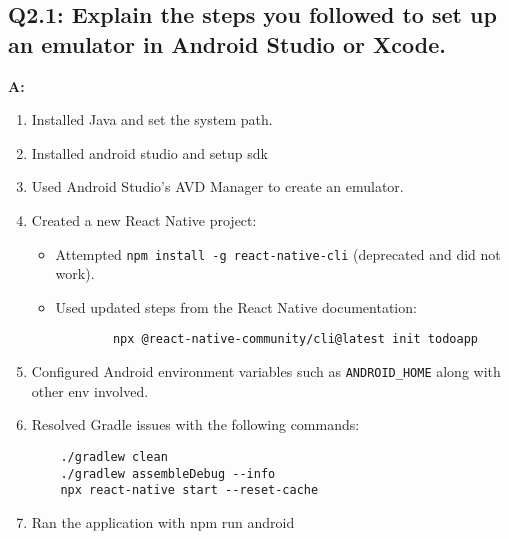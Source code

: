 \documentclass{article}
\begin{document}
\subsection*{Q2.1: Explain the steps you followed to set up an emulator in Android Studio or Xcode.}
\textbf{A:}
\begin{enumerate}
    \item Installed Java and set the system path.
    \item Installed android studio and setup sdk 
    \item Used Android Studio’s AVD Manager to create an emulator.
    \item Created a new React Native project:
    \begin{itemize}
        \item Attempted \texttt{npm install -g react-native-cli} (deprecated and did not work).
        \item Used updated steps from the React Native documentation:
        \begin{verbatim}
        npx @react-native-community/cli@latest init todoapp
        \end{verbatim}
    \end{itemize}
    \item Configured Android environment variables such as \texttt{ANDROID\_HOME} along with other env involved.
    \item Resolved Gradle issues with the following commands:
    \begin{verbatim}
    ./gradlew clean
    ./gradlew assembleDebug --info
    npx react-native start --reset-cache
    \end{verbatim}
    \item Ran the application with npm run android
\end{enumerate}
\end{document}
